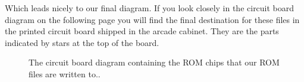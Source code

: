 Which leads nicely to our final diagram. If you look closely in the circuit board diagram on the following page you
will find the final destination for these files in the printed circuit board shipped in the arcade cabinet. They
are the parts indicated by stars at the top of the board.
\begin{figure}[H]
      \centering
    \caption{The circuit board diagram containing the ROM chips that our ROM files are written to..}
\end{figure}

